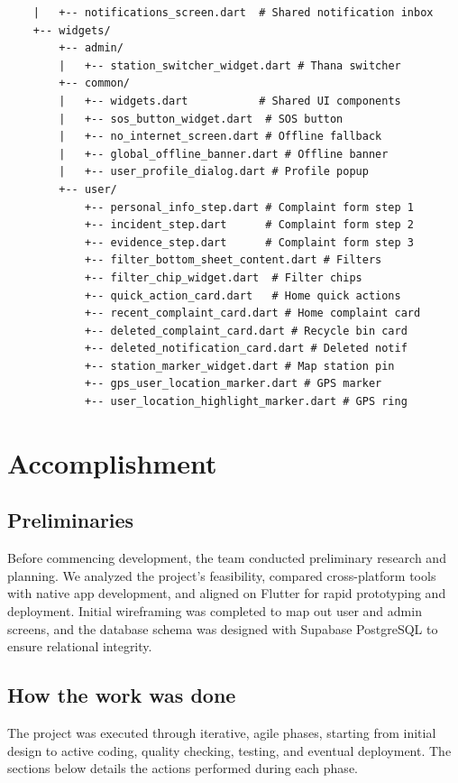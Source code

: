 \documentclass[12pt, a4paper, twoside]{report}
\begin{document}
\begin{footnotesize}
\begin{verbatim}
    |   +-- notifications_screen.dart  # Shared notification inbox
    +-- widgets/
        +-- admin/
        |   +-- station_switcher_widget.dart # Thana switcher
        +-- common/
        |   +-- widgets.dart           # Shared UI components
        |   +-- sos_button_widget.dart  # SOS button
        |   +-- no_internet_screen.dart # Offline fallback
        |   +-- global_offline_banner.dart # Offline banner
        |   +-- user_profile_dialog.dart # Profile popup
        +-- user/
            +-- personal_info_step.dart # Complaint form step 1
            +-- incident_step.dart      # Complaint form step 2
            +-- evidence_step.dart      # Complaint form step 3
            +-- filter_bottom_sheet_content.dart # Filters
            +-- filter_chip_widget.dart  # Filter chips
            +-- quick_action_card.dart   # Home quick actions
            +-- recent_complaint_card.dart # Home complaint card
            +-- deleted_complaint_card.dart # Recycle bin card
            +-- deleted_notification_card.dart # Deleted notif
            +-- station_marker_widget.dart # Map station pin
            +-- gps_user_location_marker.dart # GPS marker
            +-- user_location_highlight_marker.dart # GPS ring
\end{verbatim}
\end{footnotesize}
\chapter{Accomplishment}
\section{Preliminaries}
Before commencing development, the team conducted preliminary research and planning. We analyzed the project's feasibility, compared cross-platform tools with native app development, and aligned on Flutter for rapid prototyping and deployment. Initial wireframing was completed to map out user and admin screens, and the database schema was designed with Supabase PostgreSQL to ensure relational integrity.

\section{How the work was done}
The project was executed through iterative, agile phases, starting from initial design to active coding, quality checking, testing, and eventual deployment. The sections below details the actions performed during each phase.
\end{document}

